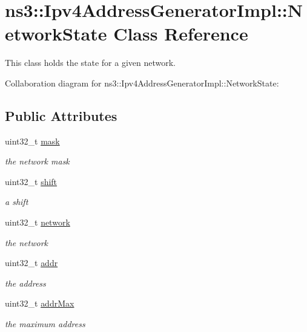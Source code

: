\hypertarget{classns3_1_1Ipv4AddressGeneratorImpl_1_1NetworkState}{}\section{ns3\+:\+:Ipv4\+Address\+Generator\+Impl\+:\+:Network\+State Class Reference}
\label{classns3_1_1Ipv4AddressGeneratorImpl_1_1NetworkState}


This class holds the state for a given network.  




Collaboration diagram for ns3\+:\+:Ipv4\+Address\+Generator\+Impl\+:\+:Network\+State\+:
\subsection*{Public Attributes}
\begin{DoxyCompactItemize}
\item 
uint32\+\_\+t \hyperlink{classns3_1_1Ipv4AddressGeneratorImpl_1_1NetworkState_af72c61673bc535c22b2dedd6afd21b4d}{mask}
\begin{DoxyCompactList}\small\item\em the network mask \end{DoxyCompactList}\item 
uint32\+\_\+t \hyperlink{classns3_1_1Ipv4AddressGeneratorImpl_1_1NetworkState_a2cc2b6173f3cb653762ea92dc986cf2c}{shift}
\begin{DoxyCompactList}\small\item\em a shift \end{DoxyCompactList}\item 
uint32\+\_\+t \hyperlink{classns3_1_1Ipv4AddressGeneratorImpl_1_1NetworkState_afe15739547ef60d7ba74c3ab6b83e6f8}{network}
\begin{DoxyCompactList}\small\item\em the network \end{DoxyCompactList}\item 
uint32\+\_\+t \hyperlink{classns3_1_1Ipv4AddressGeneratorImpl_1_1NetworkState_a9ef9d11050694760071d58b72659a7a3}{addr}
\begin{DoxyCompactList}\small\item\em the address \end{DoxyCompactList}\item 
uint32\+\_\+t \hyperlink{classns3_1_1Ipv4AddressGeneratorImpl_1_1NetworkState_adab2718b8dd6b5236d57199c3e60e5f2}{addr\+Max}
\begin{DoxyCompactList}\small\item\em the maximum address \end{DoxyCompactList}\end{DoxyCompactItemize}


